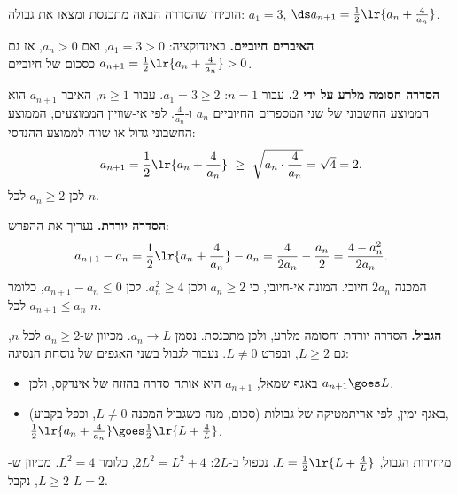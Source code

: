 הוכיחו שהסדרה הבאה מתכנסת ומצאו את גבולה:
$a_1=3$, $\ds a_{n+1}=\frac12\lr{a_n+\frac{4}{a_n}}$.
\begin{solbox}
\textbf{האיברים חיוביים.}
באינדוקציה: $a_1=3>0$, ואם $a_n>0$, אז גם $a_{n+1}=\frac12\lr{a_n+\frac4{a_n}}>0$ כסכום של חיוביים.

\textbf{הסדרה חסומה מלרע על ידי $2$.}
עבור $n=1$: $a_1=3\ge2$.
עבור $n\ge1$, האיבר $a_{n+1}$ הוא הממוצע החשבוני של שני המספרים החיוביים $a_n$ ו-$\frac4{a_n}$.
לפי אי-שוויון הממוצעים, הממוצע החשבוני גדול או שווה לממוצע ההנדסי:
$$a_{n+1}=\frac12\lr{a_n+\frac4{a_n}}\ \ge\ \sqrt{a_n\cdot\frac4{a_n}}=\sqrt4=2 .$$
לכן $a_n\ge2$ לכל $n$.

\textbf{הסדרה יורדת.}
נעריך את ההפרש:
$$a_{n+1}-a_n=\frac12\lr{a_n+\frac4{a_n}}-a_n=\frac{4}{2a_n}-\frac{a_n}{2}=\frac{4-a_n^2}{2a_n}.$$
המכנה $2a_n$ חיובי. המונה אי-חיובי, כי $a_n\ge2$ ולכן $a_n^2\ge4$.
לכן $a_{n+1}-a_n\le0$, כלומר $a_{n+1}\le a_n$ לכל $n$.

\textbf{הגבול.}
הסדרה יורדת וחסומה מלרע, ולכן מתכנסת. נסמן $a_n\to L$. מכיוון ש-$a_n\ge2$ לכל $n$, גם $L\ge2$, ובפרט $L\ne0$.
נעבור לגבול בשני האגפים של נוסחת הנסיגה:
\begin{itemize}
\item באגף שמאל, $a_{n+1}$ היא אותה סדרה בהזזה של אינדקס, ולכן $a_{n+1}\goes L$.
\item באגף ימין, לפי אריתמטיקה של גבולות (סכום, מנה כשגבול המכנה $L\ne0$, וכפל בקבוע), $\frac12\lr{a_n+\frac4{a_n}}\goes\frac12\lr{L+\frac4L}$.
\end{itemize}
מיחידות הגבול, $L=\frac12\lr{L+\frac4L}$. נכפול ב-$2L$: $2L^2=L^2+4$, כלומר $L^2=4$.
מכיוון ש-$L\ge2$, נקבל $L=2$.
\end{solbox}
